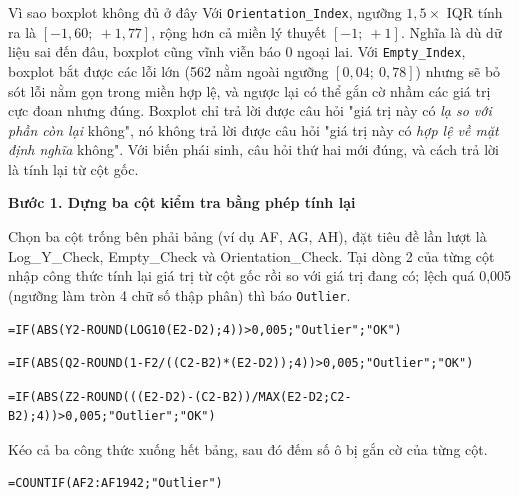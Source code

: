 \documentclass[12pt]{article}
\begin{document}
\begin{guidelinebox}{Vì sao boxplot không đủ ở đây}
Với \texttt{Orientation\_Index}, ngưỡng $1{,}5 \times$ IQR tính ra là $[-1{,}60;\ +1{,}77]$, rộng hơn cả miền lý thuyết $[-1;\ +1]$. Nghĩa là dù dữ liệu sai đến đâu, boxplot cũng vĩnh viễn báo 0 ngoại lai. Với \texttt{Empty\_Index}, boxplot bắt được các lỗi lớn (562 nằm ngoài ngưỡng $[0{,}04;\ 0{,}78]$) nhưng sẽ bỏ sót lỗi nằm gọn trong miền hợp lệ, và ngược lại có thể gắn cờ nhầm các giá trị cực đoan nhưng đúng. Boxplot chỉ trả lời được câu hỏi "giá trị này có \emph{lạ so với phần còn lại} không", nó không trả lời được câu hỏi "giá trị này có \emph{hợp lệ về mặt định nghĩa} không". Với biến phái sinh, câu hỏi thứ hai mới đúng, và cách trả lời là tính lại từ cột gốc.
\end{guidelinebox}

\noindent
\textbf{Bước 1. Dựng ba cột kiểm tra bằng phép tính lại}

\noindent
Chọn ba cột trống bên phải bảng (ví dụ AF, AG, AH), đặt tiêu đề lần lượt là Log\_Y\_Check, Empty\_Check và Orientation\_Check. Tại dòng 2 của từng cột nhập công thức tính lại giá trị từ cột gốc rồi so với giá trị đang có; lệch quá 0,005 (ngưỡng làm tròn 4 chữ số thập phân) thì báo \texttt{Outlier}.
\begin{aivncodebox}
\begin{lstlisting}[language=Excel]
=IF(ABS(Y2-ROUND(LOG10(E2-D2);4))>0,005;"Outlier";"OK")\end{lstlisting}
\end{aivncodebox}

\begin{aivncodebox}
\begin{lstlisting}[language=Excel]
=IF(ABS(Q2-ROUND(1-F2/((C2-B2)*(E2-D2));4))>0,005;"Outlier";"OK")\end{lstlisting}
\end{aivncodebox}

\begin{aivncodebox}
\begin{lstlisting}[language=Excel]
=IF(ABS(Z2-ROUND(((E2-D2)-(C2-B2))/MAX(E2-D2;C2-B2);4))>0,005;"Outlier";"OK")\end{lstlisting}
\end{aivncodebox}

\noindent
Kéo cả ba công thức xuống hết bảng, sau đó đếm số ô bị gắn cờ của từng cột.
\begin{aivncodebox}
\begin{lstlisting}[language=Excel]
=COUNTIF(AF2:AF1942;"Outlier")\end{lstlisting}
\end{aivncodebox}
\end{document}
